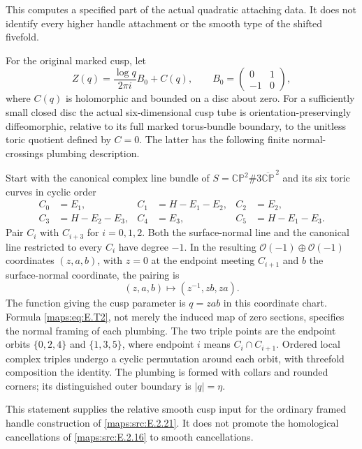This computes a specified part of the actual quadratic
attaching data.  It does not identify every higher handle
attachment or the smooth type of the shifted fivefold.


\begin{proposition}\label{maps:src:E.2.19}


For the original marked cusp, let
\[
 Z(q)=\frac{\log q}{2\pi i}B_0+C(q),\qquad
 B_0=\begin{pmatrix}0&1\\-1&0\end{pmatrix},
\]
where $C(q)$ is holomorphic and bounded on a disc about zero.
For a sufficiently small closed disc the actual six-dimensional
cusp tube is orientation-preservingly diffeomorphic, relative to
its full marked torus-bundle boundary, to the unitless toric
quotient defined by $C=0$.  The latter has the following finite
normal-crossings plumbing description.

Start with the canonical complex line bundle of
$S=\mathbb {CP}^2\#3\overline{\mathbb {CP}}^{\,2}$ and its six
toric curves in cyclic order
\[
 \begin{aligned}
 C_0&=E_1,& C_1&=H-E_1-E_2,& C_2&=E_2,\\
 C_3&=H-E_2-E_3,& C_4&=E_3,& C_5&=H-E_1-E_3.
 \end{aligned}
 \tag{E.T1}\label{maps:eq:E.T1}
\]
Pair $C_i$ with $C_{i+3}$ for $i=0,1,2$.  Both the surface-normal
line and the canonical line restricted to every $C_i$ have degree
$-1$.  In the resulting $\mathcal O(-1)\oplus\mathcal O(-1)$
coordinates $(z,a,b)$, with $z=0$ at the endpoint meeting
$C_{i+1}$ and $b$ the surface-normal coordinate, the pairing is
\[
             (z,a,b)\longmapsto(z^{-1},zb,za).
 \tag{E.T2}\label{maps:eq:E.T2}
\]
The function giving the cusp parameter is $q=zab$ in this
coordinate chart.  Formula \eqref{maps:eq:E.T2}, not merely the induced map
of zero sections, specifies the normal framing of each plumbing.
The two triple points are the endpoint orbits
$\{0,2,4\}$ and $\{1,3,5\}$, where endpoint $i$ means
$C_i\cap C_{i+1}$.  Ordered local complex triples undergo a
cyclic permutation around each orbit, with threefold composition
the identity.  The plumbing is formed with collars and rounded
corners; its distinguished outer boundary is $|q|=\eta$.

This statement supplies the relative smooth cusp input for the
ordinary framed handle construction of \ref{maps:src:E.2.21}.  It does not
promote the homological cancellations of \ref{maps:src:E.2.16} to smooth
cancellations.

\end{proposition}


